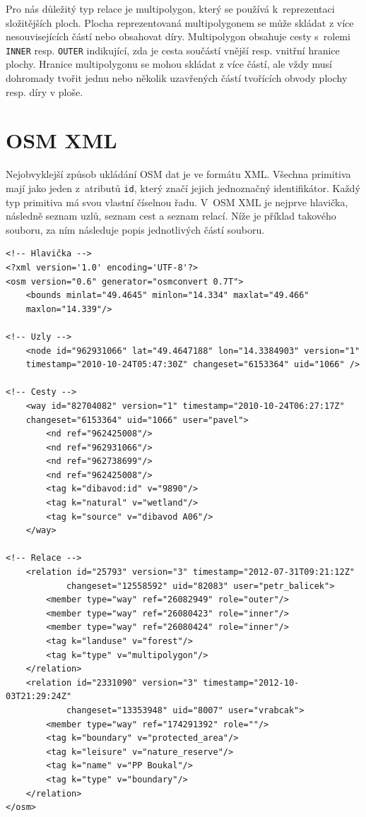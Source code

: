 Pro nás důležitý typ relace je multipolygon, který se používá k~reprezentaci
složitějších ploch. Plocha reprezentovaná multipolygonem se může skládat z více
nesouvisejících částí nebo obsahovat díry. Multipolygon obsahuje cesty s~rolemi 
\verb|INNER| resp. \verb|OUTER| indikující, zda je cesta součástí vnější resp.
vnitřní hranice plochy. Hranice multipolygonu se mohou skládat z více částí, ale
vždy musí dohromady tvořit jednu nebo několik uzavřených částí tvořících obvody 
plochy resp. díry v ploše.

\section{OSM XML}
Nejobvyklejší způsob ukládání OSM dat je ve formátu XML. Všechna primitiva mají
jako jeden z~atributů \verb|id|, který značí jejich jednoznačný identifikátor.
Každý typ primitiva má svou vlastní číselnou řadu. V~OSM XML \cite{osmxml} je
nejprve hlavička, následně seznam uzlů, seznam cest a seznam relací. Níže je
příklad takového souboru, za ním následuje popis jednotlivých částí souboru.

\begin{verbatim}
<!-- Hlavička -->
<?xml version='1.0' encoding='UTF-8'?>
<osm version="0.6" generator="osmconvert 0.7T">
	<bounds minlat="49.4645" minlon="14.334" maxlat="49.466" 
	maxlon="14.339"/>

<!-- Uzly -->
	<node id="962931066" lat="49.4647188" lon="14.3384903" version="1" 
	timestamp="2010-10-24T05:47:30Z" changeset="6153364" uid="1066" />

<!-- Cesty -->
	<way id="82704082" version="1" timestamp="2010-10-24T06:27:17Z" 
	changeset="6153364" uid="1066" user="pavel">
	    <nd ref="962425008"/>
	    <nd ref="962931066"/>
	    <nd ref="962738699"/>
	    <nd ref="962425008"/>
	    <tag k="dibavod:id" v="9890"/>
	    <tag k="natural" v="wetland"/>
	    <tag k="source" v="dibavod A06"/>
	</way>

<!-- Relace -->
	<relation id="25793" version="3" timestamp="2012-07-31T09:21:12Z" 
			changeset="12558592" uid="82083" user="petr_balicek">
	    <member type="way" ref="26082949" role="outer"/>
	    <member type="way" ref="26080423" role="inner"/>
	    <member type="way" ref="26080424" role="inner"/>
	    <tag k="landuse" v="forest"/>
	    <tag k="type" v="multipolygon"/>
	</relation>
	<relation id="2331090" version="3" timestamp="2012-10-03T21:29:24Z"
			changeset="13353948" uid="8007" user="vrabcak">
	    <member type="way" ref="174291392" role=""/>
	    <tag k="boundary" v="protected_area"/>
	    <tag k="leisure" v="nature_reserve"/>
	    <tag k="name" v="PP Boukal"/>
	    <tag k="type" v="boundary"/>
	</relation>
</osm>
\end{verbatim}


